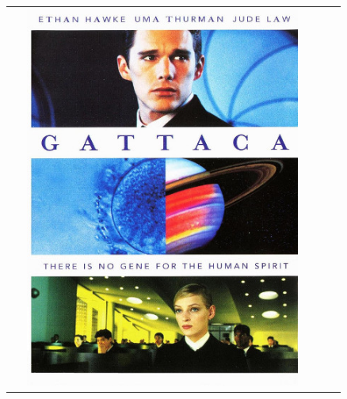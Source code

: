 \begin{tabular}{c c c}
\begin{minipage}{5cm}
\includegraphics[width=0.9\textwidth]{affiches/gattaca.jpg}
\end{minipage} &
\begin{minipage}{5cm}

\end{minipage}
\end{tabular}
